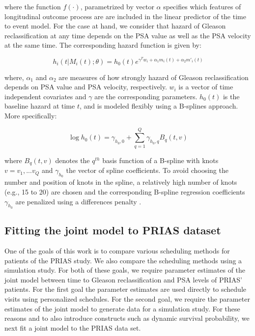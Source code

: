where the function $f(\cdot)$, parametrized by vector $\alpha$ specifies which features of longitudinal outcome process are are included in the linear predictor of the time to event model. For the case at hand, we consider that hazard of Gleason reclassification at any time depends on the PSA value as well as the PSA velocity at the same time. The corresponding hazard function is given by:

\begin{equation}
h_i(t|M_i(t); \theta) = h_0(t) e^{\gamma^Tw_i + \alpha_1 m_i(t) + \alpha_2 m'_i(t)}
\end{equation}

where, $\alpha_1$ and $\alpha_2$ are measures of how strongly hazard of Gleason reclassification depends on PSA value and PSA velocity, respectively. $w_i$ is a vector of time independent covariates and $\gamma$ are the corresponding parameters. $h_0(t)$ is the baseline hazard at time $t$, and is modeled flexibly using a B-splines approach. More specifically:

\begin{equation}
\label{eq : baseline_hazard}
\log h_0(t) = \gamma_{h_0, 0} + \sum_{q=1}^Q  \gamma_{h_0, q} B_q(t, v)
\end{equation}

where $B_q(t, v)$ denotes the $q^{th}$ basis function of a B-spline with knots $v = v_1,...v_Q$ and $\gamma_{h_0}$ the vector of spline coefficients. To avoid choosing the number and position of knots in the spline, a relatively high number of knots (e.g., 15 to 20) are chosen and the corresponding B-spline regression coefficients $\gamma_{h_0}$ are penalized using a differences penalty \cite{eilers1996flexible}.

\subsection{Fitting the joint model to PRIAS dataset}
One of the goals of this work is to compare various scheduling methods for patients of the PRIAS study. We also compare the scheduling methods using a simulation study. For both of these goals, we require parameter estimates of  the joint model between time to Gleason reclassification and PSA levels of PRIAS' patients. For the first goal the parameter estimates are used directly to schedule visits using personalized schedules. For the second goal, we require the parameter estimates of the  joint model to generate data for a simulation study. For these reasons and to also introduce constructs such as dynamic survival probability, we next fit a joint model to the PRIAS data set.\\

